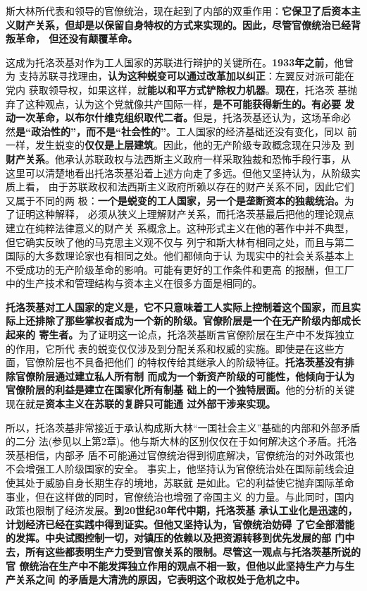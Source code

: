 斯大林所代表和领导的官僚统治，现在起到了内部的双重作用：\textbf{它保卫了后资本主
  义财产关系，但却是以保留自身特权的方式来实现的。因此，尽管官僚统治已经背叛革命，
  但还没有颠覆革命。}

这成为托洛茨基对作为工人国家的苏联进行辩护的关键所在。\textbf{1933年之前}，他曾为
支持苏联寻找理由，\textbf{认为这种蜕变可以通过改革加以纠正}：左翼反对派可能在党内
获取领导权，如果这样，就\textbf{能以和平方式铲除权力机器}。\textbf{现在}，托洛茨
基抛弃了这种观点，认为这个党就像共产国际一样，\textbf{是不可能获得新生的。有必要
  发动一次革命，以布尔什维克组织取代二者。}但是，托洛茨基还认为，这场革命必
然\textbf{是“政治性的”，而不是“社会性的”}。工人国家的经济基础还没有变化，同以
前一样，发生蜕变的\textbf{仅仅是上层建筑}。因此，他的无产阶级专政概念现在只涉及
到\textbf{财产关系}。他承认苏联政权与法西斯主义政府一样采取独裁和恐怖手段行事，从
这里可以清楚地看出托洛茨基沿着上述方向走了多远。但他又坚持认为，从阶级实质上看，
由于苏联政权和法西斯主义政府所赖以存在的财产关系不同，因此它们又属于不同的两
极：\textbf{一个是蜕变的工人国家，另一个是垄断资本的独裁统治。}为了证明这种解释，
必须从狭义上理解财产关系，而托洛茨基最后把他的理论观点建立在纯粹法律意义的财产关
系概念上。这种形式主义在他的著作中并不典型，但它确实反映了他的马克思主义观不仅与
列宁和斯大林有相同之处，而且与第二国际的大多数理论家也有相同之处。他们都倾向于认
为现实中的社会关系基本上不受成功的无产阶级革命的影响。可能有更好的工作条件和更高
的报酬，但工厂中的生产技术和管理结构与资本主义在很多方面是相同的。

\textbf{托洛茨基对工人国家的定义是，它不只意味着工人实际上控制着这个国家，而且实
  际上还排除了那些掌权者成为一个新的阶级。官僚阶层是一个在无产阶级内部成长起来的
  寄生者。}为了证明这一论点，托洛茨基断言官僚阶层在生产中不发挥独立的作用，它所代
表的蜕变仅仅涉及到分配关系和权威的实施。即使是在这些方面，官僚阶层也不具备把他们
的特权传给其继承人的阶级特征。\textbf{托洛茨基没有排除官僚阶层通过建立私人所有制
  而成为一个新资产阶级的可能性，他倾向于认为官僚阶层的利益是建立在国家化所有制基
  础上的一个独特层面。}他的分析的关键现在就是\textbf{资本主义在苏联的复辟只可能通
  过外部干涉来实现。}

所以，托洛茨基非常接近于承认构成斯大林“一国社会主义”基础的内部和外部矛盾的二分
法(参见以上第2章)。他与斯大林的区别仅仅在于如何解决这个矛盾。托洛茨基相信，内部矛
盾不可能通过官僚统治得到彻底解决，官僚统治的对外政策也不会增强工人阶级国家的安全。
事实上，他坚持认为官僚统治处在国际前线会迫使其处于威胁自身长期生存的境地，苏联就
是如此。它的利益使它抛弃国际革命事业，但在这样做的同时，官僚统治也增强了帝国主义
的力量。与此同时，国内政策也限制了经济发展。\textbf{到20世纪30年代中期，托洛茨基
  承认工业化是迅速的，计划经济已经在实践中得到证实。但他又坚持认为，官僚统治妨碍
  了它全部潜能的发挥。中央试图控制一切，对镇压的依赖以及把资源转移到优先发展的部
  门中去，所有这些都表明生产力受到官僚关系的限制。尽管这一观点与托洛茨基所说的官
  僚统治在生产中不能发挥独立作用的观点不相一致，但他以此坚持生产力与生产关系之间
  的矛盾是大清洗的原因，它表明这个政权处于危机之中。}

